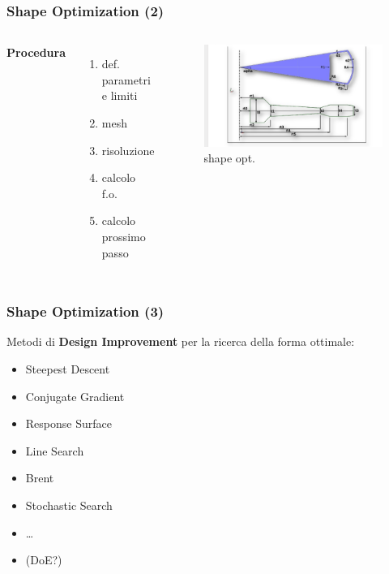\documentclass{beamer}
\begin{document}
\begin{frame}
	\frametitle{Shape Optimization (2)}
	\begin{columns}[c] %
		
		\textbf{Procedura}
		\begin{enumerate}
			\item def. parametri e limiti
			\item mesh
			\item risoluzione
			\item calcolo f.o.
			\item calcolo prossimo passo
		\end{enumerate}
		
		\begin{figure}
			\includegraphics[width=0.9\linewidth]{./images/shape.png}
			\caption{shape opt.}
			\label{fig:shape}
		\end{figure}
	\end{columns}
\end{frame}


\begin{frame}
	\frametitle{Shape Optimization (3)}
	Metodi di \textbf{Design Improvement} per la ricerca della forma ottimale:
	\begin{itemize}
		\item Steepest Descent
		\item Conjugate Gradient
		\item Response Surface
		\item Line Search
		\item Brent
		\item Stochastic Search
		\item \ldots
		\item (DoE?)
	\end{itemize}
\end{frame}
\end{document}

